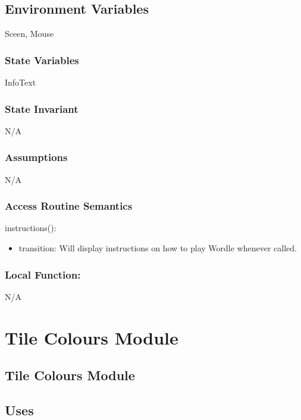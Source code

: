 \documentclass[12pt]{article}
\begin{document}
\subsection*{Environment Variables}

Sceen, Mouse

\subsubsection* {State Variables}
InfoText

\subsubsection* {State Invariant}

N/A

\subsubsection* {Assumptions}

N/A

\subsubsection* {Access Routine Semantics}

\noindent instructions():
\begin{itemize}
  \item transition: Will display instructions on how to play Wordle whenever called.
\end{itemize}

\subsubsection*{Local Function:}

N/A

\newpage

\section {Tile Colours Module}

\subsection* {Tile Colours Module}

\subsection* {Uses}
\end{document}
